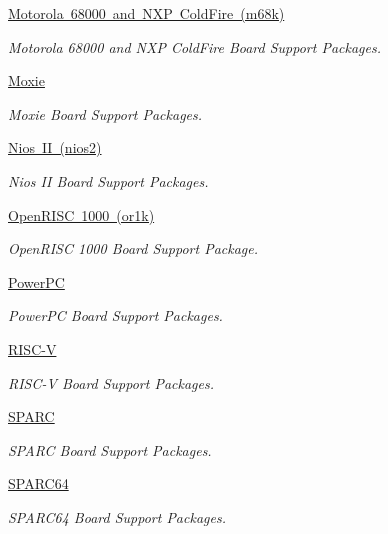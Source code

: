 \begin{DoxyCompactItemize}
\mbox{\hyperlink{group__RTEMSBSPsM68k}{Motorola 68000 and N\+X\+P Cold\+Fire (m68k)}}
\begin{DoxyCompactList}\small\item\em Motorola 68000 and N\+XP Cold\+Fire Board Support Packages. \end{DoxyCompactList}\item 
\mbox{\hyperlink{group__RTEMSBSPsMoxie}{Moxie}}
\begin{DoxyCompactList}\small\item\em Moxie Board Support Packages. \end{DoxyCompactList}\item 
\mbox{\hyperlink{group__RTEMSBSPsNios2}{Nios I\+I (nios2)}}
\begin{DoxyCompactList}\small\item\em Nios II Board Support Packages. \end{DoxyCompactList}\item 
\mbox{\hyperlink{group__RTEMSBSPsOR1K}{Open\+R\+I\+S\+C 1000 (or1k)}}
\begin{DoxyCompactList}\small\item\em Open\+R\+I\+SC 1000 Board Support Package. \end{DoxyCompactList}\item 
\mbox{\hyperlink{group__RTEMSBSPsPowerPC}{Power\+PC}}
\begin{DoxyCompactList}\small\item\em Power\+PC Board Support Packages. \end{DoxyCompactList}\item 
\mbox{\hyperlink{group__RTEMSBSPsRISCV}{R\+I\+S\+C-\/V}}
\begin{DoxyCompactList}\small\item\em R\+I\+S\+C-\/V Board Support Packages. \end{DoxyCompactList}\item 
\mbox{\hyperlink{group__RTEMSBSPsSPARC}{S\+P\+A\+RC}}
\begin{DoxyCompactList}\small\item\em S\+P\+A\+RC Board Support Packages. \end{DoxyCompactList}\item 
\mbox{\hyperlink{group__RTEMSBSPsSPARC64}{S\+P\+A\+R\+C64}}
\begin{DoxyCompactList}\small\item\em S\+P\+A\+R\+C64 Board Support Packages. \end{DoxyCompactList}\item 

\end{DoxyCompactItemize}
